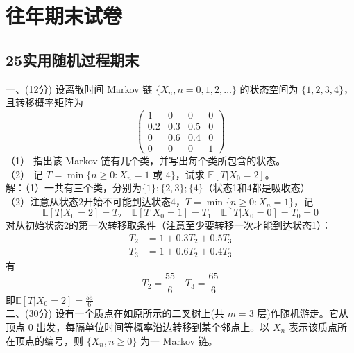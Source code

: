 \documentclass[UTF8,openany]{book}
\begin{document}
\chapter{\centering 往年期末试卷}
\section{\centering 25实用随机过程期末}
\noindent 一、(12分) 设离散时间 Markov 链 $\{X_n, n = 0,1,2,\ldots\}$ 的状态空间为 $\{1,2,3,4\}$，且转移概率矩阵为
\[
\begin{pmatrix}
	1 & 0 & 0 & 0 \\
	0.2 & 0.3 & 0.5 & 0 \\
	0 & 0.6 & 0.4 & 0 \\
	0 & 0 & 0 & 1
\end{pmatrix}
\]
（1） 指出该 Markov 链有几个类，并写出每个类所包含的状态。\\
（2） 记 $T = \min\{n \geq 0 : X_n =  \text{1 或 4} \}$，试求 $\mathbb{E}[T|X_0 = 2]$。\\
解：（1）一共有三个类，分别为$\{1\};\{2,3\};\{4\}$（状态1和4都是吸收态）\\
（2）注意从状态2开始不可能到达状态4，$T = \min\{n \geq 0 : X_n = 1\}$，记
\[
\mathbb{E}[T|X_0 = 2]=T_2\quad
\mathbb{E}[T|X_0 = 1]=T_1\quad
\mathbb{E}[T|X_0 = 0]=T_0=0
\]
对从初始状态2的第一次转移取条件（注意至少要转移一次才能到达状态1）：
$$
\begin{aligned}
	T_2 &= 1+0.3T_2+0.5T_3 \\
	T_3 &= 1+0.6T_2+0.4T_3
\end{aligned}
$$
有
\[
T_2=\frac{55}{6} \quad T_3=\frac{65}{6}
\]
即$\mathbb{E}[T|X_0 = 2]=\frac{55}{6}$\\


\noindent 二、(30分) 设有一个质点在如原所示的二叉树上(共 $m = 3$ 层)作随机游走。它从顶点 0 出发，每隔单位时间等概率沿边转移到某个邻点上。以 $X_n$ 表示该质点所在顶点的编号，则 $\{X_n, n \geq 0\}$ 为一 Markov 链。
\begin{figure}[h!]
	\centering
\end{figure}
\end{document}
